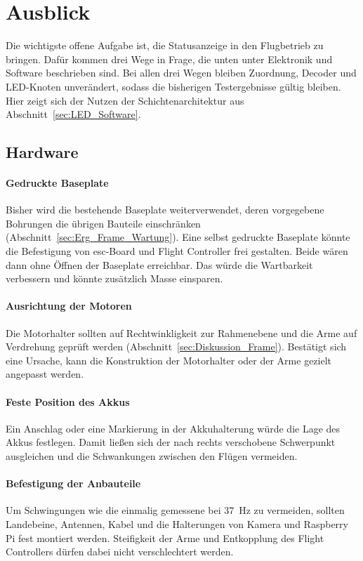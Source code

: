 \section{Ausblick}
\label{sec:Ausblick}

Die wichtigste offene Aufgabe ist, die Statusanzeige in den Flugbetrieb zu bringen. Dafür kommen drei Wege in Frage, die unten unter Elektronik und Software beschrieben sind. Bei allen drei Wegen bleiben Zuordnung, Decoder und LED-Knoten unverändert, sodass die bisherigen Testergebnisse gültig bleiben. Hier zeigt sich der Nutzen der Schichtenarchitektur aus Abschnitt~\ref{sec:LED_Software}.

    \subsection{Hardware}
    \label{sec:Ausblick_Hardware}

    \paragraph{Gedruckte Baseplate}
    Bisher wird die bestehende Baseplate weiterverwendet, deren vorgegebene Bohrungen die übrigen Bauteile einschränken (Abschnitt~\ref{sec:Erg_Frame_Wartung}). Eine selbst gedruckte Baseplate könnte die Befestigung von \gls{esc}-Board und Flight Controller frei gestalten. Beide wären dann ohne Öffnen der Baseplate erreichbar. Das würde die Wartbarkeit verbessern und könnte zusätzlich Masse einsparen.

    \paragraph{Ausrichtung der Motoren}
    Die Motorhalter sollten auf Rechtwinkligkeit zur Rahmenebene und die Arme auf Verdrehung geprüft werden (Abschnitt~\ref{sec:Diskussion_Frame}). Bestätigt sich eine Ursache, kann die Konstruktion der Motorhalter oder der Arme gezielt angepasst werden.

    \paragraph{Feste Position des Akkus}
    Ein Anschlag oder eine Markierung in der Akkuhalterung würde die Lage des Akkus festlegen. Damit ließen sich der nach rechts verschobene Schwerpunkt ausgleichen und die Schwankungen zwischen den Flügen vermeiden.

    \paragraph{Befestigung der Anbauteile}
    Um Schwingungen wie die einmalig gemessene bei \SI{37}{\hertz} zu vermeiden, sollten Landebeine, Antennen, Kabel und die Halterungen von Kamera und Raspberry Pi fest montiert werden. Steifigkeit der Arme und Entkopplung des Flight Controllers dürfen dabei nicht verschlechtert werden.

